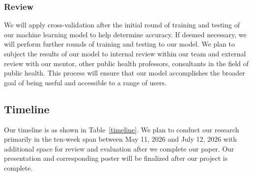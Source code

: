 \documentclass[journal]{IEEEtran}
\begin{document}
    \subsubsection{Review}

    We will apply cross-validation after the initial round of training and testing of our machine learning model to help determine accuracy. If deemed necessary, we will perform further rounds of training and testing to our model. We plan to subject the results of our model to internal review within our team and external review with our mentor, other public health professors, consultants in the field of public health. This process will ensure that our model accomplishes the broader goal of being useful and accessible to a range of users.

    \subsection{Timeline}

    Our timeline is as shown in Table~\ref{timeline}. We plan to conduct our research primarily in the ten-week span between May 11, 2026 and July 12, 2026 with additional space for review and evaluation after we complete our paper. Our presentation and corresponding poster will be finalized after our project is complete.

    \renewcommand{\arraystretch}{1.3}
\end{document}
